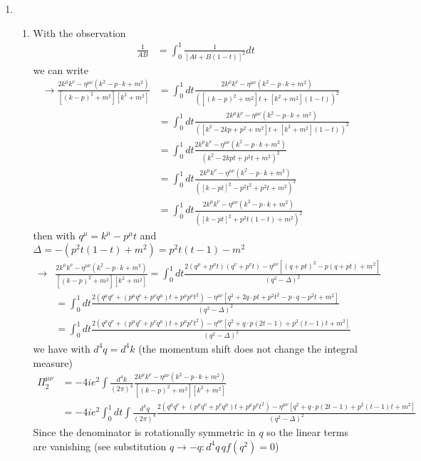 \documentclass[10pt,a4paper]{article}
\theoremstyle{definition}
\begin{document}
\begin{enumerate}[1.]
\item
\begin{enumerate}[1.)]
\item With the observation
\begin{align}
\frac{1}{AB}&=\int_0^1\frac{1}{[At+B(1-t)]^2}dt
\end{align}
we can write
\begin{align}
\rightarrow \frac{2k^\mu k^\nu-\eta^{\mu\nu}(k^2-p\cdot k+m^2)}{[(k-p)^2+m^2][k^2+m^2]} 
&=\int_0^1 dt \frac{2k^\mu k^\nu-\eta^{\mu\nu}(k^2-p\cdot k+m^2)}{([(k-p)^2+m^2]t+[k^2+m^2](1-t))^2}\\
&=\int_0^1 dt \frac{2k^\mu k^\nu-\eta^{\mu\nu}(k^2-p\cdot k+m^2)}{([k^2-2kp+p^2+m^2]t+[k^2+m^2](1-t))^2}\\
&=\int_0^1 dt \frac{2k^\mu k^\nu-\eta^{\mu\nu}(k^2-p\cdot k+m^2)}{(k^2-2kpt+p^2t+m^2)^2}\\
&=\int_0^1 dt \frac{2k^\mu k^\nu-\eta^{\mu\nu}(k^2-p\cdot k+m^2)}{([k-pt]^2-p^2t^2+p^2t+m^2)^2}\\
&=\int_0^1 dt \frac{2k^\mu k^\nu-\eta^{\mu\nu}(k^2-p\cdot k+m^2)}{([k-pt]^2+p^2t(1-t)+m^2)^2}
\end{align}
then with $q^\mu=k^\mu-p^\mu t$ and $\Delta=-(p^2t(1-t)+m^2)=p^2t(t-1)-m^2$
\begin{align}
\rightarrow &\frac{2k^\mu k^\nu-\eta^{\mu\nu}(k^2-p\cdot k+m^2)}{[(k-p)^2+m^2][k^2+m^2]} 
=\int_0^1 dt \frac{2(q^\mu+p^\mu t)(q^\nu+p^\nu t)-\eta^{\mu\nu}[(q+pt)^2-p(q+pt)+m^2]}{(q^2-\Delta)^2}\\
&=\int_0^1 dt \frac{2(q^\mu q^\nu+(p^\mu q^\nu+p^\nu q^\mu) t+p^\mu p^\nu t^2)-\eta^{\mu\nu}[q^2+2q\cdot p t+p^2 t^2-p\cdot q-p^2t+m^2]}{(q^2-\Delta)^2}\\
&=\int_0^1 dt \frac{2(q^\mu q^\nu+(p^\mu q^\nu+p^\nu q^\mu) t+p^\mu p^\nu t^2)-\eta^{\mu\nu}[q^2+q\cdot p(2t-1)+p^2(t-1)t+m^2]}{(q^2-\Delta)^2}
\end{align}
we have with $d^4q=d^4k$ (the momentum shift does not change the integral measure)
\begin{align}
\Pi_2^{\mu\nu}
&=-4ie^2\int\frac{d^4k}{(2\pi)^4}\frac{2k^\mu k^\nu-\eta^{\mu\nu}(k^2-p\cdot k+m^2)}{[(k-p)^2+m^2][k^2+m^2]}\\
&=-4ie^2\int_0^1 dt\int\frac{d^4q}{(2\pi)^4} \frac{2(q^\mu q^\nu+(p^\mu q^\nu+p^\nu q^\mu) t+p^\mu p^\nu t^2)-\eta^{\mu\nu}[q^2+q\cdot p(2t-1)+p^2(t-1)t+m^2]}{(q^2-\Delta)^2}
\end{align}
Since the denominator is rotationally symmetric in $q$ so the linear terms are vanishing (see substitution $q\rightarrow-q: d^4q\,q f(q^2)= 0$)

\end{enumerate}
\end{enumerate}
\end{document}
